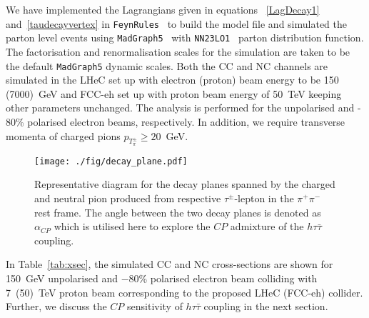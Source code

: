\documentclass[pdftex,twocolumn,epjc3]{svjour3}          %
\begin{document}
\par We have implemented the Lagrangians given in equations ~\eqref{LagDecay1} and~\eqref{taudecayvertex} in \texttt{FeynRules}~\cite{Alloul:2013bka} to build the model file and simulated the parton level events  using \texttt{MadGraph5}~\cite{Alwall:2014hca} with \texttt{NN23LO1}~\cite{Ball:2012cx} parton distribution function. The factorisation and renormalisation scales for the simulation are taken to be the default \texttt{MadGraph5} dynamic scales. Both the CC and NC channels are simulated in the LHeC set up with electron (proton) beam energy to be 150 (7000)~GeV and FCC-eh set up with proton beam energy of 50~TeV keeping other parameters unchanged. The analysis is performed for the unpolarised and - 80\% polarised electron beams, respectively. In addition, we require transverse momenta of charged pions $p_{T_\pi^\pm} \ge 20$~GeV.
%
\begin{table}[t]
\centering
{}
\caption{  {\small SM cross sections for the CC and NC processes as shown in Fig.~\ref{fig:figW} for unpolarised ($-$80\% polarised) 150~GeV electron beam colliding with 7~TeV and 50~TeV  proton beams corresponding to LHeC and FCC-eh respectively.}}
\label{tab:xsec}
\end{table}
%
\begin{figure}[t]
	\texttt{[image: ./fig/decay\_plane.pdf]}
	\caption{  {\small Representative diagram for the decay planes spanned by the charged and neutral pion produced from respective $\tau^\pm$-lepton in the $\pi^{+}\pi^{-}$ rest frame. The angle between the two decay planes is denoted as $\alpha_{CP}$ which is utilised here to explore the $CP$ admixture of the $h\tau{\bar\tau}$ coupling.}}
	\label{fig:decayPlane}
\end{figure}
%

In Table~\ref{tab:xsec}, the simulated CC and NC cross-sections are shown  for 150~GeV unpolarised and $-$80\% polarised electron beam colliding with 7~(50)~TeV proton beam corresponding to the proposed LHeC (FCC-eh) collider. Further, we discuss the $CP$ sensitivity of    $h\tau{\bar\tau}$ coupling in the next section.  
\end{document}
